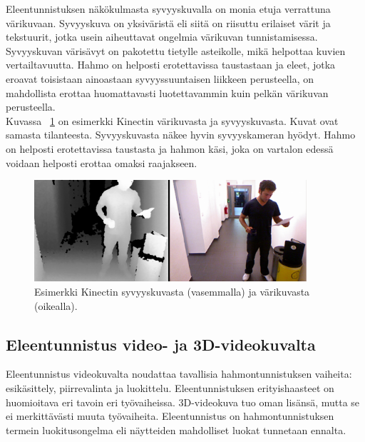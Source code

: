 Eleentunnistuksen näkökulmasta syvyyskuvalla on monia etuja verrattuna värikuvaan. Syvyyskuva on yksiväristä
eli siitä on riisuttu erilaiset värit ja tekstuurit, jotka usein aiheuttavat ongelmia värikuvan tunnistamisessa.
Syvyyskuvan värisävyt on pakotettu tietylle asteikolle, mikä helpottaa kuvien vertailtavuutta. \citep{5995316} Hahmo on helposti erotettavissa
taustastaan ja eleet, jotka eroavat toisistaan ainoastaan syvyyssuuntaisen liikkeen perusteella, 
on mahdollista erottaa huomattavasti luotettavammin kuin pelkän värikuvan perusteella.\\
 
Kuvassa ~\ref{fig:kinectkuva} on esimerkki Kinectin värikuvasta ja syvyyskuvasta. Kuvat ovat samasta tilanteesta.
Syvyyskuvasta näkee hyvin syvyyskameran hyödyt. Hahmo on helposti erotettavissa taustasta ja hahmon käsi, 
joka on vartalon edessä voidaan helposti erottaa omaksi raajakseen. \\

\begin{figure}[htb]
  \begin{center}
    \includegraphics[width=0.9\textwidth]{kinect1_cropped-1024x382.png}
    \caption{Esimerkki Kinectin syvyyskuvasta (vasemmalla) ja värikuvasta (oikealla). \citep {kinectkuva}}
    \label{fig:kinectkuva}
  \end{center}
\end{figure}

\subsection{Eleentunnistus video- ja 3D-videokuvalta}

Eleentunnistus videokuvalta noudattaa tavallisia hahmontunnistuksen vaiheita: esikäsittely, piirrevalinta ja
luokittelu. Eleentunnistuksen erityishaasteet on huomioitava eri tavoin eri työvaiheissa. 3D-videokuva tuo 
oman lisänsä, mutta se ei merkittävästi muuta työvaiheita. Eleentunnistus on hahmontunnistuksen termein
luokitusongelma eli näytteiden mahdolliset luokat tunnetaan ennalta. \citep{6239178}  \\

